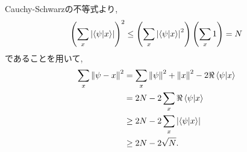 \begin{ex}
    \label{ex6.14}
\end{ex}

\begin{ex}
    \label{ex6.15}
    Cauchy-Schwarzの不等式より,
    \begin{align*}
        \left( \sum_x \left| \braket{\psi|x} \right| \right)^2
        \leq
        \left( \sum_x  \left|  \braket{\psi|x} \right|^2 \right)\left(\sum_x  1\right)
        = N
    \end{align*}
    であることを用いて,
    \begin{align*}
        \sum_x \left\| \psi - x \right\|^2
         & =
        \sum_x \left\| \psi \right\|^2 +\left\| x \right\|^2 - 2 \Re \braket{\psi|x} \\
         & =
        2N - 2\sum_x \Re \braket{\psi|x}
        \\
         & \geq
        2N - 2\sum_x \left| \braket{\psi|x} \right|
        \\
         & \geq
        2N - 2\sqrt{N}.
    \end{align*}
\end{ex}
